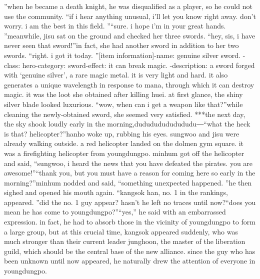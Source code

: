 ”when he became a death knight, he was disqualified as a player, so he could not use the community.
“if i hear anything unusual, i’ll let you know right away.
 don’t worry.
 i am the best in this field.
”“sure.
 i hope i’m in your great hands.
”meanwhile, jisu sat on the ground and checked her three swords.
“hey, sis, i have never seen that sword!”in fact, she had another sword in addition to her two swords.
“right.
 i got it today.
”[item information]-name: genuine silver sword.
-class: hero-category: sword-effect: it can break magic.
-description: a sword forged with ‘genuine silver’, a rare magic metal.
 it is very light and hard.
 it also generates a unique wavelength in response to mana, through which it can destroy magic.
it was the loot she obtained after killing huei.
 at first glance, the shiny silver blade looked luxurious.
“wow, when can i get a weapon like that?”while cleaning the newly-obtained sword, she seemed very satisfied.
***the next day, the sky shook loudly early in the morning,dudududududududu―“what the heck is that? helicopter?”hanho woke up, rubbing his eyes.
 sungwoo and jisu were already walking outside.
a red helicopter landed on the dolmen gym square.
 it was a firefighting helicopter from youngdungpo.
minhum got off the helicopter and said, “sungwoo, i heard the news that you have defeated the pirates.
 you are awesome!”“thank you, but you must have a reason for coming here so early in the morning?”minhum nodded and said, “something unexpected happened.
”he then sighed and opened his mouth again.
“kangsok han, no.
 1 in the rankings, appeared.
”did the no.
1 guy appear? hasn’t he left no traces until now?“does you mean he has come to youngdungpo?”“yes,” he said with an embarrassed expression.
 in fact, he had to absorb those in the vicinity of youngdungpo to form a large group, but at this crucial time, kangsok appeared suddenly, who was much stronger than their current leader junghoon, the master of the liberation guild, which should be the central base of the new alliance.
 since the guy who has been unknown until now appeared, he naturally drew the attention of everyone in youngdungpo.


